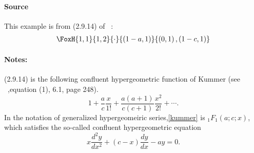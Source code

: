 \paragraph{Source} This example is from (2.9.14) of
~\cite{kilbas.saigo:04:h-transforms}:
\begin{align*}
  \FoxH
    {1,1}
    {1,2}
    {\cdot}
    {\left(1-a, 1\right)}
    {\left(0, 1\right), \left(1-c, 1\right)}
\end{align*}
\paragraph{Notes:}
(2.9.14) is the following confluent hypergeometric function of Kummer (see ~\cite{erdelyi.magnus.ea:81:higher*1},equation (1), 6.1, page 248).
\begin{equation}\label{kummer} 
1+ \frac{a}{c}\frac{x}{1!} + \frac{a(a+1)}{c(c+1)}\frac{x^2}{2!} + \cdots .
\end{equation}
In the notation of generalized hypergeomeiric series,\eqref{kummer} is ${}_1F_1(a;c;x)$, which satisfies the so-called confluent hypergeometric equation
$$ x \frac{d^2 y}{d x^2}+(c-x) \frac{d y}{d x}-a y=0.$$
